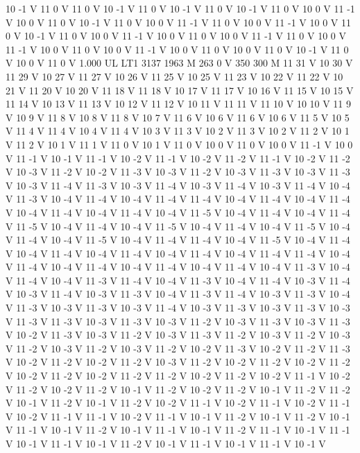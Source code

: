 {10 -1 V
11 0 V
11 0 V
10 -1 V
11 0 V
10 -1 V
11 0 V
10 -1 V
11 0 V
10 0 V
11 -1 V
10 0 V
11 0 V
10 -1 V
11 0 V
10 0 V
11 -1 V
11 0 V
10 0 V
11 -1 V
10 0 V
11 0 V
10 -1 V
11 0 V
10 0 V
11 -1 V
10 0 V
11 0 V
10 0 V
11 -1 V
11 0 V
10 0 V
11 -1 V
10 0 V
11 0 V
10 0 V
11 -1 V
10 0 V
11 0 V
10 0 V
11 0 V
10 -1 V
11 0 V
10 0 V
11 0 V
1.000 UL
LT1
3137 1963 M
263 0 V
350 300 M
11 31 V
10 30 V
11 29 V
10 27 V
11 27 V
10 26 V
11 25 V
10 25 V
11 23 V
10 22 V
11 22 V
10 21 V
11 20 V
10 20 V
11 18 V
11 18 V
10 17 V
11 17 V
10 16 V
11 15 V
10 15 V
11 14 V
10 13 V
11 13 V
10 12 V
11 12 V
10 11 V
11 11 V
11 10 V
10 10 V
11 9 V
10 9 V
11 8 V
10 8 V
11 8 V
10 7 V
11 6 V
10 6 V
11 6 V
10 6 V
11 5 V
10 5 V
11 4 V
11 4 V
10 4 V
11 4 V
10 3 V
11 3 V
10 2 V
11 3 V
10 2 V
11 2 V
10 1 V
11 2 V
10 1 V
11 1 V
11 0 V
10 1 V
11 0 V
10 0 V
11 0 V
10 0 V
11 -1 V
10 0 V
11 -1 V
10 -1 V
11 -1 V
10 -2 V
11 -1 V
10 -2 V
11 -2 V
11 -1 V
10 -2 V
11 -2 V
10 -3 V
11 -2 V
10 -2 V
11 -3 V
10 -3 V
11 -2 V
10 -3 V
11 -3 V
10 -3 V
11 -3 V
10 -3 V
11 -4 V
11 -3 V
10 -3 V
11 -4 V
10 -3 V
11 -4 V
10 -3 V
11 -4 V
10 -4 V
11 -3 V
10 -4 V
11 -4 V
10 -4 V
11 -4 V
11 -4 V
10 -4 V
11 -4 V
10 -4 V
11 -4 V
10 -4 V
11 -4 V
10 -4 V
11 -4 V
10 -4 V
11 -5 V
10 -4 V
11 -4 V
10 -4 V
11 -4 V
11 -5 V
10 -4 V
11 -4 V
10 -4 V
11 -5 V
10 -4 V
11 -4 V
10 -4 V
11 -5 V
10 -4 V
11 -4 V
10 -4 V
11 -5 V
10 -4 V
11 -4 V
11 -4 V
10 -4 V
11 -5 V
10 -4 V
11 -4 V
10 -4 V
11 -4 V
10 -4 V
11 -4 V
10 -4 V
11 -4 V
10 -4 V
11 -4 V
11 -4 V
10 -4 V
11 -4 V
10 -4 V
11 -4 V
10 -4 V
11 -4 V
10 -4 V
11 -4 V
10 -4 V
11 -3 V
10 -4 V
11 -4 V
10 -4 V
11 -3 V
11 -4 V
10 -4 V
11 -3 V
10 -4 V
11 -4 V
10 -3 V
11 -4 V
10 -3 V
11 -4 V
10 -3 V
11 -3 V
10 -4 V
11 -3 V
11 -4 V
10 -3 V
11 -3 V
10 -4 V
11 -3 V
10 -3 V
11 -3 V
10 -3 V
11 -4 V
10 -3 V
11 -3 V
10 -3 V
11 -3 V
10 -3 V
11 -3 V
11 -3 V
10 -3 V
11 -3 V
10 -3 V
11 -2 V
10 -3 V
11 -3 V
10 -3 V
11 -3 V
10 -2 V
11 -3 V
10 -3 V
11 -2 V
10 -3 V
11 -3 V
11 -2 V
10 -3 V
11 -2 V
10 -3 V
11 -2 V
10 -3 V
11 -2 V
10 -3 V
11 -2 V
10 -2 V
11 -3 V
10 -2 V
11 -2 V
11 -3 V
10 -2 V
11 -2 V
10 -2 V
11 -2 V
10 -3 V
11 -2 V
10 -2 V
11 -2 V
10 -2 V
11 -2 V
10 -2 V
11 -2 V
10 -2 V
11 -2 V
11 -2 V
10 -2 V
11 -2 V
10 -2 V
11 -1 V
10 -2 V
11 -2 V
10 -2 V
11 -2 V
10 -1 V
11 -2 V
10 -2 V
11 -2 V
10 -1 V
11 -2 V
11 -2 V
10 -1 V
11 -2 V
10 -1 V
11 -2 V
10 -2 V
11 -1 V
10 -2 V
11 -1 V
10 -2 V
11 -1 V
10 -2 V
11 -1 V
11 -1 V
10 -2 V
11 -1 V
10 -1 V
11 -2 V
10 -1 V
11 -2 V
10 -1 V
11 -1 V
10 -1 V
11 -2 V
10 -1 V
11 -1 V
10 -1 V
11 -2 V
11 -1 V
10 -1 V
11 -1 V
10 -1 V
11 -1 V
10 -1 V
11 -2 V
10 -1 V
11 -1 V
10 -1 V
11 -1 V
10 -1 V
}
